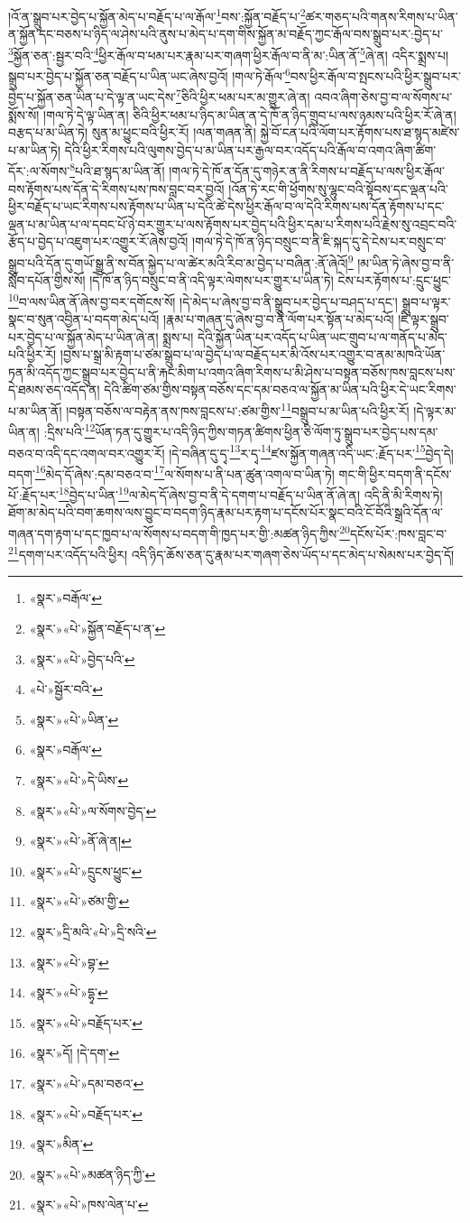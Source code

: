 །འོ་ན་སྒྲུབ་པར་བྱེད་པ་སྐྱོན་མེད་པ་བརྗོད་པ་ལ་རྒོལ་\footnote{«སྣར་»བརྒོལ་}བས་:སྐྱོན་བརྗོད་པ་\footnote{«སྣར་»«པེ་»སྐྱོན་བརྗོད་པ་ན་}ཚར་གཅད་པའི་གནས་རིགས་པ་ཡིན་ན་སྐྱོན་དང་བཅས་པ་ཉིད་ལ་ཤེས་པའི་ནུས་པ་མེད་པ་དག་གིས་སྐྱོན་མ་བརྗོད་ཀྱང་རྒོལ་བས་སྒྲུབ་པར་:བྱེད་པ་\footnote{«སྣར་»«པེ་»བྱེད་པའི་}སྐྱོན་ཅན་:སྦྱར་བའི་\footnote{«པེ་»སྦྱོར་བའི་}ཕྱིར་རྒོལ་བ་ཕམ་པར་རྣམ་པར་གཞག་ཕྱིར་རྒོལ་བ་ནི་མ་:ཡིན་ནོ་\footnote{«སྣར་»«པེ་»ཡིན་}ཞེ་ན། འདིར་སྨྲས་པ། སྒྲུབ་པར་བྱེད་པ་སྐྱོན་ཅན་བརྗོད་པ་ཡིན་ཡང་ཞེས་བྱའོ། །གལ་ཏེ་རྒོལ་\footnote{«སྣར་»བརྒོལ་}བས་ཕྱིར་རྒོལ་བ་སྤངས་པའི་ཕྱིར་སྒྲུབ་པར་བྱེད་པ་སྐྱོན་ཅན་ཡིན་པ་དེ་ལྟ་ན་ཡང་དེས་\footnote{«སྣར་»«པེ་»དེ་ཡིས་}ཅིའི་ཕྱིར་ཕམ་པར་མ་གྱུར་ཞེ་ན། འབའ་ཞིག་ཅེས་བྱ་བ་ལ་སོགས་པ་སྨོས་སོ། །གལ་ཏེ་དེ་ལྟ་ཡིན་ན། ཅིའི་ཕྱིར་ཕམ་པ་ཉིད་མ་ཡིན་ན་དེ་ཁོ་ན་ཉིད་གྲུབ་པ་ལས་ཉམས་པའི་ཕྱིར་རོ་ཞེ་ན། བརྩད་པ་མ་ཡིན་ཏེ། སུན་མ་ཕྱུང་བའི་ཕྱིར་རོ། །ལན་གཞན་ནི། སྐྱེ་བོ་ངན་པའི་ལོག་པར་རྟོགས་པས་ཐ་སྙད་མཛེས་པ་མ་ཡིན་ཏེ། དེའི་ཕྱིར་རིགས་པའི་ལུགས་བྱེད་པ་མ་ཡིན་པར་རྒྱལ་བར་འདོད་པའི་རྒོལ་བ་འགའ་ཞིག་ཚིག་དོར་:ལ་སོགས་\footnote{«སྣར་»«པེ་»ལ་སོགས་བྱེད་}པའི་ཐ་སྙད་མ་ཡིན་ནོ། །གལ་ཏེ་དེ་ཁོ་ན་དོན་དུ་གཉེར་ན་ནི་རིགས་པ་བརྗོད་པ་ལས་ཕྱིར་རྒོལ་བས་རྟོགས་པས་དོན་དེ་རིགས་པས་ཁས་བླང་བར་བྱའོ། །འོན་ཏེ་རང་གི་ཕྱོགས་སུ་ལྷུང་བའི་སྟོབས་དང་ལྡན་པའི་ཕྱིར་བརྗོད་པ་ཡང་རིགས་པས་རྟོགས་པ་ཡིན་པ་དེའི་ཚེ་དེས་ཕྱིར་རྒོལ་བ་ལ་དེའི་རིགས་པས་དོན་རྟོགས་པ་དང་ལྡན་པ་མ་ཡིན་པ་ལ་དབང་པོ་ཉེ་བར་གྱུར་པ་ལས་རྟོགས་པར་བྱེད་པའི་ཕྱིར་དམ་པ་རིགས་པའི་རྗེས་སུ་འབྲང་བའི་རྩོད་པ་བྱེད་པ་འཇུག་པར་འགྱུར་རོ་ཞེས་བྱའོ། །གལ་ཏེ་དེ་ཁོ་ན་ཉིད་བསྲུང་བ་ནི་ཇི་སྐད་དུ་དེ་ངེས་པར་བསྲུང་བ་སྒྲུབ་པའི་དོན་དུ་གཡོ་སྒྱུ་ནི་ས་བོན་སྐྱེད་པ་ལ་ཚེར་མའི་རིབ་མ་བྱེད་པ་བཞིན་:ནོ་ཞེའོ།\footnote{«སྣར་»«པེ་»ནོ་ཞེ་ན།} །མ་ཡིན་ཏེ་ཞེས་བྱ་བ་ནི་སློབ་དཔོན་གྱིས་སོ། །དེ་ཁོ་ན་ཉིད་བསྲུང་བ་ནི་འདི་ལྟར་ལེགས་པར་གྱུར་པ་ཡིན་ཏེ། ངེས་པར་རྟོགས་པ་:དྲུང་ཕྱུང་\footnote{«སྣར་»«པེ་»དྲུངས་ཕྱུང་}བ་ལས་ཡིན་ནོ་ཞེས་བྱ་བར་དགོངས་སོ། །དེ་མེད་པ་ཞེས་བྱ་བ་ནི་སྒྲུབ་པར་བྱེད་པ་བཤད་པ་དང་། སྒྲུབ་པ་ལྟར་སྣང་བ་སུན་འབྱིན་པ་བདག་མེད་པའོ། །རྣམ་པ་གཞན་དུ་ཞེས་བྱ་བ་ནི་ལོག་པར་སྟོན་པ་མེད་པའོ། །ཇི་ལྟར་སྒྲུབ་པར་བྱེད་པ་ལ་སྐྱོན་མེད་པ་ཡིན་ཞེ་ན། སྨྲས་པ། དེའི་སྐྱོན་ཡིན་པར་འདོད་པ་ཡིན་ཡང་གྲུབ་པ་ལ་གནོད་པ་མེད་པའི་ཕྱིར་རོ། །བྱས་པ་སྒྲ་མི་རྟག་པ་ཙམ་སྒྲུབ་པ་ལ་བྱེད་པ་ལ་བརྗོད་པར་མི་འོས་པར་འགྱུར་བ་ནམ་མཁའི་ཡོན་ཏན་མི་འདོད་ཀྱང་སྒྲུབ་པར་བྱེད་པ་ནི་རྐང་མིག་པ་འགའ་ཞིག་རིགས་པ་མི་ཤེས་པ་བསྟན་བཅོས་ཁས་བླངས་པས་དེ་ཐམས་ཅད་འདོད་ན། དེའི་ཚིག་ཙམ་གྱིས་བསྟན་བཅོས་དང་དམ་བཅའ་ལ་སྐྱོན་མ་ཡིན་པའི་ཕྱིར་དེ་ཡང་རིགས་པ་མ་ཡིན་ནོ། །བསྟན་བཅོས་ལ་བརྟེན་ནས་ཁས་བླངས་པ་:ཙམ་གྱིས་\footnote{«སྣར་»«པེ་»ཙམ་གྱི་}བསྒྲུབ་པ་མ་ཡིན་པའི་ཕྱིར་རོ། །དེ་ལྟར་མ་ཡིན་ན། :དྲིས་པའི་\footnote{«སྣར་»དྲི་མའི་«པེ་»དྲི་སའི་}ཡོན་ཏན་དུ་གྱུར་པ་འདི་ཉིད་ཀྱིས་གཏན་ཚིགས་ཕྱིན་ཅི་ལོག་ཏུ་སྒྲུབ་པར་བྱེད་པས་དམ་བཅའ་བ་འདི་དང་འགལ་བར་འགྱུར་རོ། །དེ་བཞིན་དུ་དྭ་\footnote{«སྣར་»«པེ་»བྷ་}ར་དྭ་\footnote{«སྣར་»«པེ་»དྷྭ་}ཛས་སྐྱོན་གཞན་འདི་ཡང་:རྗོད་པར་\footnote{«སྣར་»«པེ་»བརྗོད་པར་}བྱེད་དེ། བདག་\footnote{«སྣར་»དོ། །དེ་དག་}མེད་དོ་ཞེས་:དམ་བཅའ་བ་\footnote{«སྣར་»«པེ་»དམ་བཅའ་}ལ་སོགས་པ་ནི་པན་ཚུན་འགལ་བ་ཡིན་ཏེ། གང་གི་ཕྱིར་བདག་ནི་དངོས་པོ་:རྗོད་པར་\footnote{«སྣར་»«པེ་»བརྗོད་པར་}བྱེད་པ་ཡིན་\footnote{«སྣར་»མིན་}ལ་མེད་དོ་ཞེས་བྱ་བ་ནི་དེ་དགག་པ་བརྗོད་པ་ཡིན་ནོ་ཞེ་ན། འདི་ནི་མི་རིགས་ཏེ། ཐོག་མ་མེད་པའི་བག་ཆགས་ལས་བྱུང་བ་བདག་ཉིད་རྣམ་པར་རྟག་པ་དངོས་པོར་སྣང་བའི་ངོ་བོའི་སྒྲའི་དོན་ལ་གཞན་དག་རྟག་པ་དང་ཁྱབ་པ་ལ་སོགས་པ་བདག་གི་ཁྱད་པར་གྱི་:མཚན་ཉིད་ཀྱིས་\footnote{«སྣར་»«པེ་»མཚན་ཉིད་ཀྱི་}དངོས་པོར་:ཁས་བླང་བ་\footnote{«སྣར་»«པེ་»ཁས་ལེན་པ་}དགག་པར་འདོད་པའི་ཕྱིར། འདི་ཉིད་ཆོས་ཅན་དུ་རྣམ་པར་གཞག་ཅེས་ཡོད་པ་དང་མེད་པ་སེམས་པར་བྱེད་དོ། 